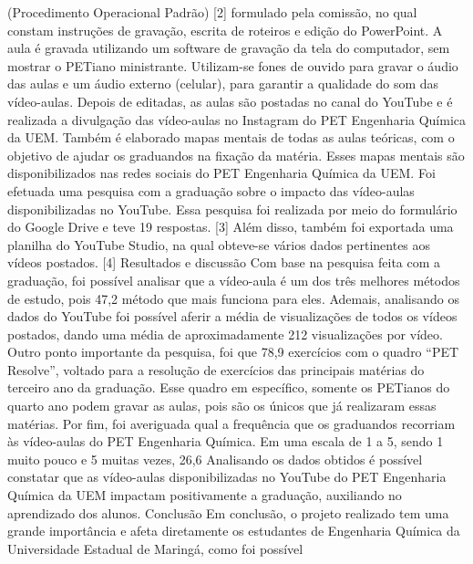(Procedimento Operacional Padrão) [2]
formulado pela comissão, no qual constam instruções de
gravação, escrita de roteiros e edição do PowerPoint. A aula é gravada utilizando um software de 
gravação da tela do computador, sem mostrar o PETiano ministrante. Utilizam-se fones de 
ouvido para gravar o áudio das aulas e um áudio externo (celular), para garantir a qualidade do 
som das vídeo-aulas. 
Depois de editadas, as aulas são postadas no canal do YouTube e é realizada a divulgação 
das vídeo-aulas no Instagram do PET Engenharia Química da UEM. Também é elaborado 
mapas mentais de todas as aulas teóricas, com o objetivo de ajudar os graduandos na fixação da 
matéria. Esses mapas mentais são disponibilizados nas redes sociais do PET Engenharia Química 
da UEM. Foi efetuada uma pesquisa com a graduação sobre o impacto das vídeo-aulas 
disponibilizadas no YouTube. Essa pesquisa foi realizada por meio do formulário do Google 
Drive e teve 19 respostas.
[3] Além disso, também foi exportada uma planilha do YouTube Studio, 
na qual obteve-se vários dados pertinentes aos vídeos postados. [4]
Resultados e discussão
Com base na pesquisa feita com a graduação, foi possível analisar que a vídeo-aula é um 
dos três melhores métodos de estudo, pois 47,2%
método que mais funciona para eles. Ademais, analisando os dados do YouTube foi possível
aferir a média de visualizações de todos os vídeos postados, dando uma média de 
aproximadamente 212 visualizações por vídeo. 
Outro ponto importante da pesquisa, foi que 78,9%
exercícios com o quadro “PET Resolve”, voltado para a resolução de exercícios das principais 
matérias do terceiro ano da graduação. Esse quadro em específico, somente os PETianos do 
quarto ano podem gravar as aulas, pois são os únicos que já realizaram essas matérias. 
Por fim, foi averiguada qual a frequência que os graduandos recorriam às vídeo-aulas do 
PET Engenharia Química. Em uma escala de 1 a 5, sendo 1 muito pouco e 5 muitas vezes, 
26,6%
Analisando os dados obtidos é possível constatar que as vídeo-aulas disponibilizadas no 
YouTube do PET Engenharia Química da UEM impactam positivamente a graduação, auxiliando 
no aprendizado dos alunos. 
Conclusão
Em conclusão, o projeto realizado tem uma grande importância e afeta diretamente os 
estudantes de Engenharia Química da Universidade Estadual de Maringá, como foi possível 
